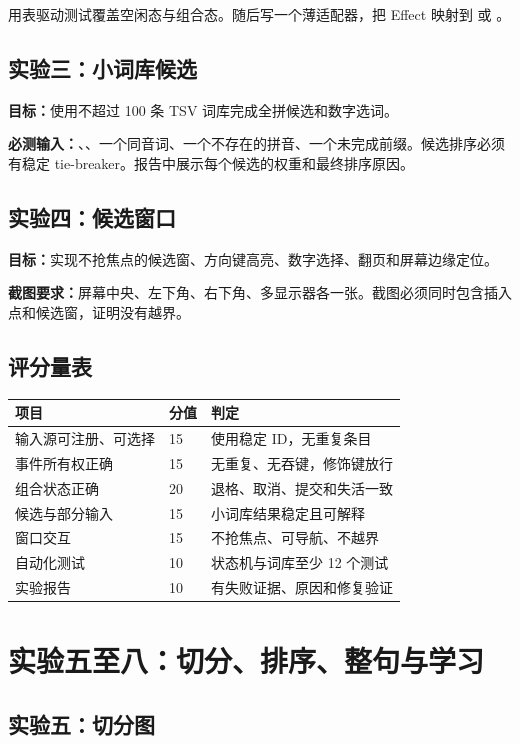 用表驱动测试覆盖空闲态与组合态。随后写一个薄适配器，把 Effect 映射到  或 。

\section{实验三：小词库候选}

\textbf{目标：}使用不超过 100 条 TSV 词库完成全拼候选和数字选词。

\textbf{必测输入：}、、一个同音词、一个不存在的拼音、一个未完成前缀。候选排序必须有稳定 tie-breaker。报告中展示每个候选的权重和最终排序原因。

\section{实验四：候选窗口}

\textbf{目标：}实现不抢焦点的候选窗、方向键高亮、数字选择、翻页和屏幕边缘定位。

\textbf{截图要求：}屏幕中央、左下角、右下角、多显示器各一张。截图必须同时包含插入点和候选窗，证明没有越界。

\section{评分量表}

\begin{longtable}{p{4cm}p{1.5cm}p{6cm}}
\toprule
项目 & 分值 & 判定 \\
\midrule
输入源可注册、可选择 & 15 & 使用稳定 ID，无重复条目 \\
事件所有权正确 & 15 & 无重复、无吞键，修饰键放行 \\
组合状态正确 & 20 & 退格、取消、提交和失活一致 \\
候选与部分输入 & 15 & 小词库结果稳定且可解释 \\
窗口交互 & 15 & 不抢焦点、可导航、不越界 \\
自动化测试 & 10 & 状态机与词库至少 12 个测试 \\
实验报告 & 10 & 有失败证据、原因和修复验证 \\
\bottomrule
\end{longtable}


\chapter{实验五至八：切分、排序、整句与学习}

\section{实验五：切分图}

